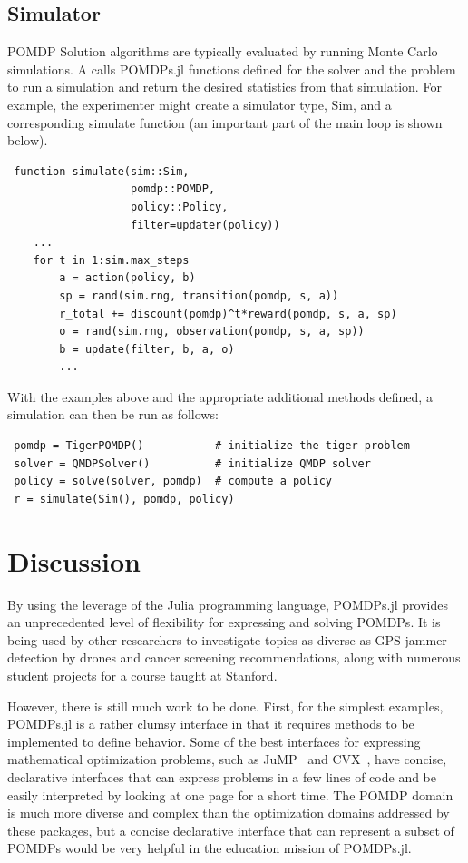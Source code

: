 \subsection{Simulator}

POMDP Solution algorithms are typically evaluated by running Monte Carlo simulations.
A  calls POMDPs.jl functions defined for the solver and the problem to run a simulation and return the desired statistics from that simulation.
For example, the experimenter might create a simulator type, {\ttfamily Sim}, and a corresponding {\ttfamily simulate} function (an important part of the main loop is shown below).
\begin{lstlisting}
 function simulate(sim::Sim,
                   pomdp::POMDP,
                   policy::Policy,
                   filter=updater(policy))
    ...
    for t in 1:sim.max_steps
        a = action(policy, b)
        sp = rand(sim.rng, transition(pomdp, s, a))
        r_total += discount(pomdp)^t*reward(pomdp, s, a, sp)
        o = rand(sim.rng, observation(pomdp, s, a, sp))
        b = update(filter, b, a, o)
        ...
\end{lstlisting}

With the examples above and the appropriate additional methods defined, a simulation can then be run as follows: 
\begin{lstlisting}
 pomdp = TigerPOMDP()           # initialize the tiger problem
 solver = QMDPSolver()          # initialize QMDP solver
 policy = solve(solver, pomdp)  # compute a policy
 r = simulate(Sim(), pomdp, policy)
\end{lstlisting}

\section{Discussion}

By using the leverage of the Julia programming language, POMDPs.jl provides an unprecedented level of flexibility for expressing and solving POMDPs. It is being used by other researchers to investigate topics as diverse as GPS jammer detection by drones and cancer screening recommendations, along with numerous student projects for a course taught at Stanford.


However, there is still much work to be done.
First, for the simplest examples, POMDPs.jl is a rather clumsy interface in that it requires methods to be implemented to define behavior.
Some of the best interfaces for expressing mathematical optimization problems, such as JuMP~\cite{dunning2017jump} and CVX~\cite{grant2014cvx}, have concise, declarative interfaces that can express problems in a few lines of code and be easily interpreted by looking at one page for a short time.
The POMDP domain is much more diverse and complex than the optimization domains addressed by these packages, but a concise declarative interface that can represent a subset of POMDPs would be very helpful in the education mission of POMDPs.jl.

